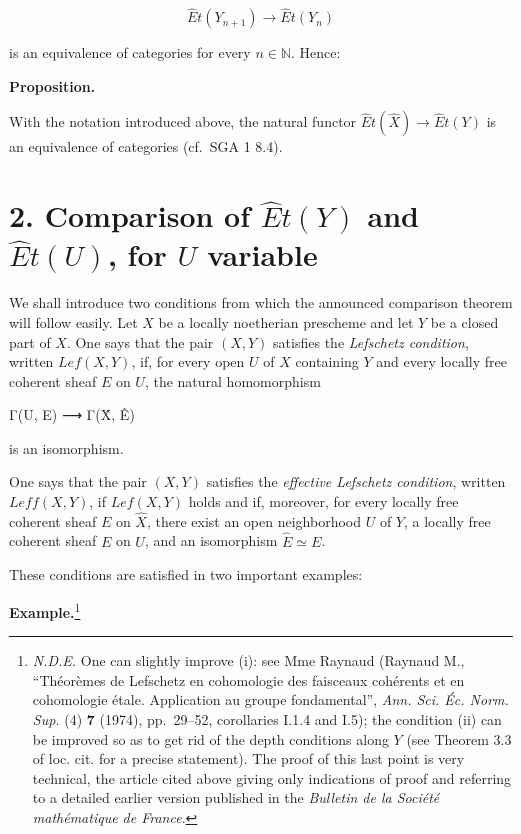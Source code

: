 \documentclass[
  11pt,
  a4paper,
]{book}
\newenvironment{Shaded}{}{}
\newcommand{\NormalTok}[1]{#1}
\begin{document}
\[ \hat{E}t(Y_{n+1}) \longrightarrow \hat{E}t(Y_{n}) \]

is an equivalence of categories for every \(n \in \mathbb{N}\). Hence:

\textbf{Proposition.}

With the notation introduced above, the natural functor
\(\hat{E}t(\hat{X}) \to \hat{E}t(Y)\) is an equivalence of categories
(cf.~SGA 1 8.4).

\section{\texorpdfstring{2. Comparison of \(\hat{E}t(Y)\) and
\(\hat{E}t(U)\), for \(U\)
variable}{2. Comparison of \textbackslash hat\{E\}t(Y) and \textbackslash hat\{E\}t(U), for U variable}}\label{comparison-of-hatety-and-hatetu-for-u-variable}

We shall introduce two conditions from which the announced comparison
theorem will follow easily. Let \(X\) be a locally noetherian prescheme
and let \(Y\) be a closed part of \(X\). One says that the pair
\((X, Y)\) satisfies the \emph{Lefschetz condition}, written
\(Lef(X, Y)\), if, for every open \(U\) of \(X\) containing \(Y\) and
every locally free coherent sheaf \(E\) on \(U\), the natural
homomorphism

\begin{Shaded}
\begin{Highlighting}[]
\NormalTok{Γ(U, E) ⟶ Γ(X̂, Ê)}
\end{Highlighting}
\end{Shaded}

is an isomorphism.

One says that the pair \((X, Y)\) satisfies the \emph{effective
Lefschetz condition}, written \(Leff(X, Y)\), if \(Lef(X, Y)\) holds and
if, moreover, for every locally free coherent sheaf \(E\) on
\(\hat{X}\), there exist an open neighborhood \(U\) of \(Y\), a locally
free coherent sheaf \(E\) on \(U\), and an isomorphism
\(\hat{E} \simeq E\).

These conditions are satisfied in two important examples:

\textbf{Example.}\footnote{\emph{N.D.E.} One can slightly improve (i):
  see Mme Raynaud (Raynaud M., ``Théorèmes de Lefschetz en cohomologie
  des faisceaux cohérents et en cohomologie étale. Application au groupe
  fondamental'', \emph{Ann. Sci. Éc. Norm. Sup.} (4) \textbf{7} (1974),
  pp.~29--52, corollaries I.1.4 and I.5); the condition (ii) can be
  improved so as to get rid of the depth conditions along \(Y\) (see
  Theorem 3.3 of loc. cit. for a precise statement). The proof of this
  last point is very technical, the article cited above giving only
  indications of proof and referring to a detailed earlier version
  published in the \emph{Bulletin de la Société mathématique de France}.}
\end{document}

